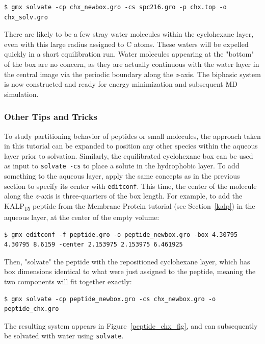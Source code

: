 \documentclass[9pt,tutorial,pubversion]{livecoms}
\begin{document}
\begin{lstlisting}
$ gmx solvate -cp chx_newbox.gro -cs spc216.gro -p chx.top -o chx_solv.gro
\end{lstlisting}

There are likely to be a few stray water molecules within the cyclohexane layer, even with this large radius assigned to C atoms. These waters will be expelled quickly in a short equilibration run. Water molecules appearing at the "bottom" of the box are no concern, as they are actually continuous with the water layer in the central image via the periodic boundary along the {\em z}-axis. The biphasic system is now constructed and ready for energy minimization and subsequent MD simulation.

\subsubsection{Other Tips and Tricks} \label{biphasic_tips_tricks}

To study partitioning behavior of peptides or small molecules, the approach taken in this tutorial can be expanded to position any other species within the aqueous layer prior to solvation. Similarly, the equilibrated cyclohexane box can be used as input to \texttt{solvate -cs} to place a solute in the hydrophobic layer. To add something to the aqueous layer, apply the same concepts as in the previous section to specify its center with \texttt{editconf}. This time, the center of the molecule along the $z$-axis is three-quarters of the box length. For example, to add the KALP\textsubscript{15} peptide from the Membrane Protein tutorial (see Section~\ref{kalp}) in the aqueous layer, at the center of the empty volume:

\begin{lstlisting}
$ gmx editconf -f peptide.gro -o peptide_newbox.gro -box 4.30795 4.30795 8.6159 -center 2.153975 2.153975 6.461925
\end{lstlisting}

Then, "solvate" the peptide with the repositioned cyclohexane layer, which has box dimensions identical to what were just assigned to the peptide, meaning the two components will fit together exactly:

\begin{lstlisting}
$ gmx solvate -cp peptide_newbox.gro -cs chx_newbox.gro -o peptide_chx.gro
\end{lstlisting}
%
The resulting system appears in Figure~\ref{peptide_chx_fig}, and can subsequently be solvated with water using \texttt{solvate}.
\end{document}
